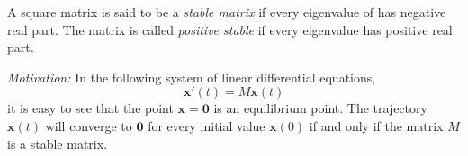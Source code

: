 \documentclass[12pt]{article}
\begin{document}
A square matrix is said to be a \emph{stable matrix} if every eigenvalue
of has negative real part. The matrix is called \emph{positive
stable} if every eigenvalue has positive real part.

{\it Motivation:} In the following system of linear differential
equations,
\[
  \mathbf{x}'(t) = M \mathbf{x}(t)
\]
it is easy to see that the point $\mathbf{x}=\mathbf{0}$ is an
equilibrium point. The trajectory $\mathbf{x}(t)$ will converge to
$\mathbf{0}$ for every initial value $\mathbf{x}(0)$ if and only if
the matrix $M$ is a stable matrix.
\end{document}
